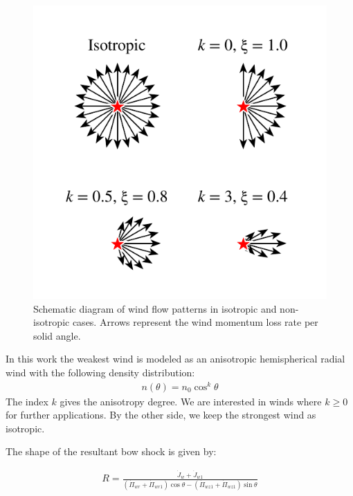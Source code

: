 \begin{figure}
  \centering
  \includegraphics[width=\linewidth]{figs/anisotropic-arrows}
  \caption[]{Schematic diagram of wind flow patterns in isotropic and
    non-isotropic cases.  Arrows represent the wind momentum loss rate
    per solid angle.}
  \label{fig:anisotropic-arrows}
\end{figure}
In this work the weakest wind is modeled as an anisotropic hemispherical radial wind
with the following density distribution:
\begin{align}
  n(\theta) = n_0\cos^k\theta
\end{align}  
The index $k$ gives the anisotropy degree. We are interested in winds where $k \geq 0$ for further applications. By the other side, we keep the strongest
wind as isotropic.

The shape of the resultant bow shock is given by:

\begin{align}
  R = \frac{\dot{J}_w + \dot{J}_{w1}}{\left(\dot{\Pi}_{wr}+\dot{\Pi}_{wr1}\right)\cos\theta-\left(\dot{\Pi}_{wz1}+\dot{\Pi}_{wz1}\right)\sin\theta}
  \label{eq:Rmom}
\end{align}

